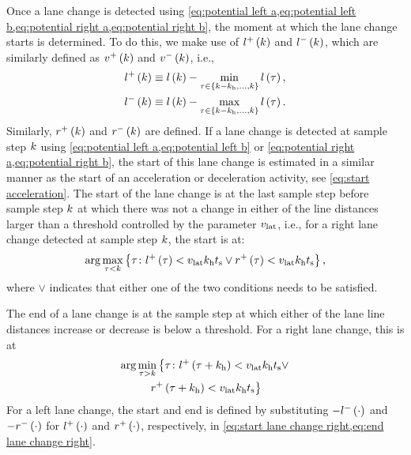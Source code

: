 Once a lane change is detected using \cref{eq:potential left a,eq:potential left b,eq:potential right a,eq:potential right b}, the moment at which the lane change starts is determined. To do this, we make use of $l^{+}\left(k\right)$ and $l^{-}\left(k\right)$, which are similarly defined as $v^{+}\left(k\right)$ and $v^{-}\left(k\right)$, i.e.,
\begin{align}
	l^{+}\left(k\right) \equiv l\left(k\right) - \min_{\tau \in \left\{k-k_{\mathrm{h}}, \ldots, k\right\}} l\left(\tau\right), \label{eq:line left inc}\\
	l^{-}\left(k\right) \equiv l\left(k\right) - \max_{\tau \in \left\{k-k_{\mathrm{h}}, \ldots, k\right\}} l\left(\tau\right). \label{eq:line left dec}
\end{align}
Similarly, $r^{+}\left(k\right)$ and $r^{-}\left(k\right)$ are defined. 
If a lane change is detected at sample step $k$ using \cref{eq:potential left a,eq:potential left b} or \cref{eq:potential right a,eq:potential right b}, the start of this lane change is estimated in a similar manner as the start of an acceleration or deceleration activity, see \cref{eq:start acceleration}. 
The start of the lane change is at the last sample step before sample step $k$ at which there was not a change in either of the line distances larger than a threshold controlled by the parameter $v_{\mathrm{lat}}$, i.e., for a right lane change detected at sample step $k$, the start is at:
\begin{equation} 
	\label{eq:start lane change right}
	\arg \max_{\tau < k} \left\{ \tau\colon l^{+}\left(\tau\right) < v_{\mathrm{lat}}k_{\mathrm{h}}t_\mathrm{s} \lor r^{+}\left(\tau\right) < v_{\mathrm{lat}}k_{\mathrm{h}}t_\mathrm{s} \right\},
\end{equation}
where $\lor$ indicates that either one of the two conditions needs to be satisfied.

The end of a lane change is at the sample step at which either of the lane line distances increase or decrease is below a threshold. For a right lane change, this is at
\begin{multline}
	\label{eq:end lane change right}
	\arg \min_{\tau > k} \left\{ \tau\colon l^{+}\left(\tau+k_{\mathrm{h}}\right)<v_{\mathrm{lat}}k_{\mathrm{h}}t_\mathrm{s} \lor \right.\\
	\left. r^{+}\left(\tau+k_{\mathrm{h}}\right)< v_{\mathrm{lat}}k_{\mathrm{h}}t_\mathrm{s} \right\}
\end{multline}
For a left lane change, the start and end is defined by substituting $-l^{-}\left(\cdot\right)$ and $-r^{-}\left(\cdot\right)$ for $l^{+}\left(\cdot\right)$ and $r^{+}\left(\cdot\right)$, respectively, in \cref{eq:start lane change right,eq:end lane change right}.
\cenda

